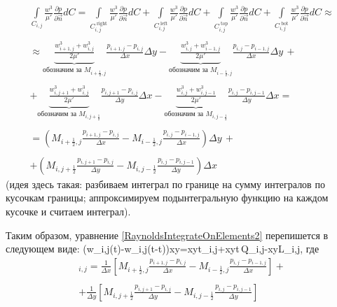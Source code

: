 \documentclass[main.tex]{subfiles}
\begin{document}
\begin{multline}
\int\limits_{C_{i,j}}{\frac{w^3}{\mu'}\frac{\partial p}{\partial\vec{n}}dC}=
\int\limits_{C_{i,j}^{\text{ right}}}{\frac{w^3}{\mu'}\frac{\partial p}{\partial\vec{n}}dC}+
\int\limits_{C_{i,j}^{\text{ left}}}{\frac{w^3}{\mu'}\frac{\partial p}{\partial\vec{n}}dC}+
\int\limits_{C_{i,j}^{\text{ top}}}{\frac{w^3}{\mu'}\frac{\partial p}{\partial\vec{n}}dC}+
\int\limits_{C_{i,j}^{\text{ bot}}}{\frac{w^3}{\mu'}\frac{\partial p}{\partial\vec{n}}dC}\approx\\\\\approx
\underbrace{\frac{w_{i+1,j}^3+w_{i,j}^3}{2\mu'}}_{\text{обозначим за }M_{i+\frac{1}{2},j}}\frac{p_{i+1,j}-p_{i,j}}{\Delta x}\Delta y-
\underbrace{\frac{w_{i,j}^3+w_{i-1,j}^3}{2\mu'}}_{\text{обозначим за }M_{i-\frac{1}{2},j}}\frac{p_{i,j}-p_{i-1,j}}{\Delta x}\Delta y\,+\\\\
+\underbrace{\frac{w_{i,j+1}^3+w_{i,j}^3}{2\mu'}}_{\text{обозначим за }M_{i,j+\frac{1}{2}}}\frac{p_{i,j+1}-p_{i,j}}{\Delta y}\Delta x-
\underbrace{\frac{w_{i,j}^3+w_{i,j-1}^3}{2\mu'}}_{\text{обозначим за }M_{i,j-\frac{1}{2}}}\frac{p_{i,j}-p_{i,j-1}}{\Delta y}\Delta x=\\\\
=\left(M_{i+\frac{1}{2},j}\frac{p_{i+1,j}-p_{i,j}}{\Delta x}-
M_{i-\frac{1}{2},j}\frac{p_{i,j}-p_{i-1,j}}{\Delta x}\right)\Delta y\,+\\\\
+\left(M_{i,j+\frac{1}{2}}\frac{p_{i,j+1}-p_{i,j}}{\Delta y}-
M_{i,j-\frac{1}{2}}\frac{p_{i,j}-p_{i,j-1}}{\Delta y}\right)\Delta x
\end{multline}
(идея здесь такая: разбиваем интеграл по границе на сумму интегралов по кусочкам границы; аппроксимируем подынтегральную функцию на каждом кусочке и считаем интеграл).


Таким образом, уравнение \eqref{RaynoldsIntegrateOnElements2} перепишется в следующем виде:
\beq
\left(w_{i,j}(t)-w_{i,j}(t-\Delta t)\right)\Delta x\Delta y=\Delta x\Delta y\Delta t\left[Ap\right]_{i,j}+\Delta x\Delta y\Delta t\,Q_{i,j}-\Delta x\Delta y\Delta L_{i,j},
\eeq
где
\begin{multline}
[Ap]_{i,j}=\frac{1}{\Delta x}
\left[M_{i+\frac{1}{2},j}\frac{p_{i+1,j}-p_{i,j}}{\Delta x}-M_{i-\frac{1}{2},j}\frac{p_{i,j}-p_{i-1,j}}{\Delta x}\right]+\\\\
+\frac{1}{\Delta y}
\left[M_{i,j+\frac{1}{2}}\frac{p_{i,j+1}-p_{i,j}}{\Delta y}-M_{i,j-\frac{1}{2}}\frac{p_{i,j}-p_{i,j-1}}{\Delta y}\right]
\end{multline}
\end{document}
